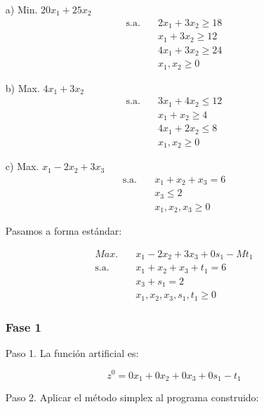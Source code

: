 \begin{itemize}
    \item[a)] Min. $20x_1 + 25x_2$
    \begin{align*}
        \text{s.a.} \quad & 2x_1 + 3x_2 \geq 18 \\
        & x_1 + 3x_2 \geq 12 \\
        & 4x_1 + 3x_2 \geq 24 \\
        & x_1, x_2 \geq 0
    \end{align*}

    
    \item[b)] Max. $4x_1 + 3x_2$
    \begin{align*}
        \text{s.a.} \quad & 3x_1 + 4x_2 \leq 12 \\
        & x_1 + x_2 \geq 4 \\
        & 4x_1 + 2x_2 \leq 8 \\
        & x_1, x_2 \geq 0
    \end{align*}
    
    \item[c)] Max. $x_1 - 2x_2 + 3x_3$
    \begin{align*}
        \text{s.a.} \quad & x_1 + x_2 + x_3 = 6 \\
        & x_3 \leq 2 \\
        & x_1, x_2, x_3 \geq 0
    \end{align*}

    Pasamos a forma estándar:

    \begin{align*}
        Max. \quad & x_1 - 2x_2 + 3x_3 + 0s_1 -Mt_1\\
        \text{s.a.} \quad & x_1 + x_2 + x_3 + t_1= 6 \\
        & x_3 + s_1 = 2 \\
        & x_1, x_2, x_3, s_1, t_1 \geq 0
    \end{align*}

    \subsubsection*{Fase 1}

    Paso 1. La función artificial es: 

    \begin{equation*}
        z^0=0x_1 + 0x_2 + 0x_3 + 0s_1 -t_1
    \end{equation*}

    Paso 2. Aplicar el método simplex al programa construido:


\end{itemize}
